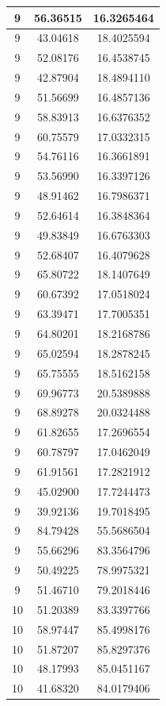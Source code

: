 \documentclass[
]{book}
\begin{document}
\begin{tabular}{c|c|c}
\hline
9 & 56.36515 & 16.3265464\\
\hline
9 & 43.04618 & 18.4025594\\
\hline
9 & 52.08176 & 16.4538745\\
\hline
9 & 42.87904 & 18.4894110\\
\hline
9 & 51.56699 & 16.4857136\\
\hline
9 & 58.83913 & 16.6376352\\
\hline
9 & 60.75579 & 17.0332315\\
\hline
9 & 54.76116 & 16.3661891\\
\hline
9 & 53.56990 & 16.3397126\\
\hline
9 & 48.91462 & 16.7986371\\
\hline
9 & 52.64614 & 16.3848364\\
\hline
9 & 49.83849 & 16.6763303\\
\hline
9 & 52.68407 & 16.4079628\\
\hline
9 & 65.80722 & 18.1407649\\
\hline
9 & 60.67392 & 17.0518024\\
\hline
9 & 63.39471 & 17.7005351\\
\hline
9 & 64.80201 & 18.2168786\\
\hline
9 & 65.02594 & 18.2878245\\
\hline
9 & 65.75555 & 18.5162158\\
\hline
9 & 69.96773 & 20.5389888\\
\hline
9 & 68.89278 & 20.0324488\\
\hline
9 & 61.82655 & 17.2696554\\
\hline
9 & 60.78797 & 17.0462049\\
\hline
9 & 61.91561 & 17.2821912\\
\hline
9 & 45.02900 & 17.7244473\\
\hline
9 & 39.92136 & 19.7018495\\
\hline
9 & 84.79428 & 55.5686504\\
\hline
9 & 55.66296 & 83.3564796\\
\hline
9 & 50.49225 & 78.9975321\\
\hline
9 & 51.46710 & 79.2018446\\
\hline
10 & 51.20389 & 83.3397766\\
\hline
10 & 58.97447 & 85.4998176\\
\hline
10 & 51.87207 & 85.8297376\\
\hline
10 & 48.17993 & 85.0451167\\
\hline
10 & 41.68320 & 84.0179406\\

\end{tabular}
\end{document}
